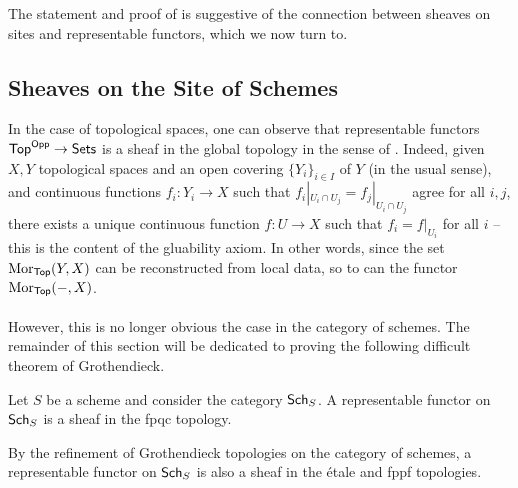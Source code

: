 The statement and proof of  is suggestive of the connection between sheaves on sites and representable functors, which we now turn to. 
\subsection{Sheaves on the Site of Schemes}\label{subsec: sites with scheme categories}
In the case of topological spaces, one can observe that representable functors $\mathsf{Top}^{\mathsf{Opp}}\to\mathsf{Sets}$ is a sheaf in the global topology in the sense of . Indeed, given $X,Y$ topological spaces and an open covering $\{Y_{i}\}_{i\in I}$ of $Y$ (in the usual sense), and continuous functions $f_{i}:Y_{i}\to X$ such that $f_{i}|_{U_{i}\cap U_{j}}=f_{j}|_{U_{i}\cap U_{j}}$ agree for all $i,j$, there exists a unique continuous function $f:U\to X$ such that $f_{i}=f|_{U_{i}}$ for all $i$ -- this is the content of the gluability axiom. In other words, since the set $\mathrm{Mor}_{\mathsf{Top}}(Y,X)$ can be reconstructed from local data, so to can the functor $\mathrm{Mor}_{\mathsf{Top}}(-,X)$. 
\\\\
However, this is no longer obvious the case in the category of schemes. The remainder of this section will be dedicated to proving the following difficult theorem of Grothendieck. 
\begin{theorem}[Grothendieck]\label{thm: Grothendieck rep functor is fpqc sheaf}
    Let $S$ be a scheme and consider the category $\mathsf{Sch}_{S}$. A representable functor on $\mathsf{Sch}_{S}$ is a sheaf in the fpqc topology. 
\end{theorem}
By the refinement of Grothendieck topologies on the category of schemes, a representable functor on $\mathsf{Sch}_{S}$ is also a sheaf in the \'{e}tale and fppf topologies. 